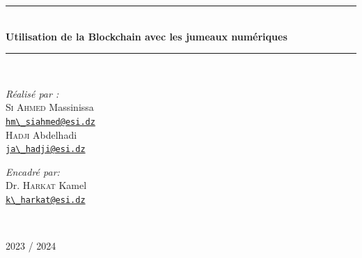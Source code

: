 {\begin{titlepage}
    \rule{\linewidth}{0.3mm} \\[0.4cm]
    {
    \Large \bfseries
    Utilisation de la Blockchain avec les jumeaux numériques\\
    }
    \rule{\linewidth}{0.3mm} \\[1cm]

    \vspace{10mm}

    \noindent
    \begin{minipage}{0.6\textwidth}
      \vspace{-7mm}
      \begin{flushleft} \large
        \emph{Réalisé par :}\\
        {
        \textsc{Si Ahmed} Massinissa\\
        \href{mailto:hm_siahmed@esi.dz}{\verb!hm\_siahmed@esi.dz!}\\
        \textsc{Hadji} Abdelhadi\\
        \href{mailto:ja_hadji@esi.dz}{\verb!ja\_hadji@esi.dz!}
        }
      \end{flushleft}
    \end{minipage}
    \begin{minipage}{0.35\textwidth}
      \begin{flushright} \large
        \begin{flushleft} \large
          \emph{Encadré par:} \\
          {
          Dr. \textsc{Harkat} Kamel\\[0.1cm]
          \href{mailto:k_harkat@esi.dz}{\verb!k\_harkat@esi.dz!}\\
          }
        \end{flushleft}
      \end{flushright}
    \end{minipage}\\[1cm]

    \vfill

    {\large 2023 / 2024}
  \end{titlepage}
  \restoregeometry
}
